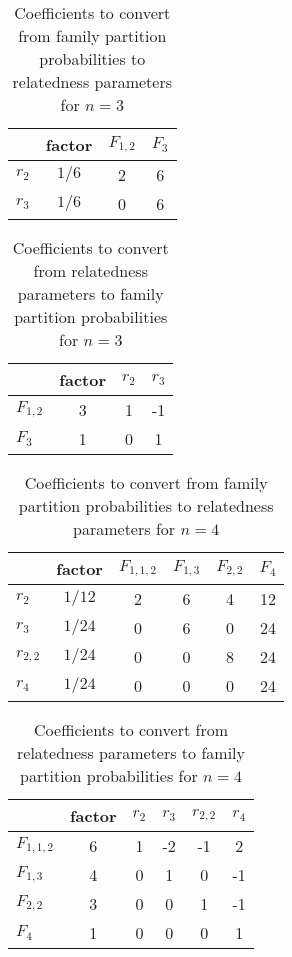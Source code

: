\begin{table}[h]
\centering
\caption{Coefficients to convert from family partition probabilities to relatedness parameters for $n=3$}
\begin{tabular}{lccc}
\toprule
        & factor &  $F_{1,2}$ &  $F_{3}$ \\
\midrule
$r_{2}$ &  $1/6$ &          2 &        6 \\
$r_{3}$ &  $1/6$ &          0 &        6 \\
\bottomrule
\end{tabular}
\end{table}

\begin{table}[h]
\centering
\caption{Coefficients to convert from relatedness parameters to family partition probabilities for $n=3$}
\begin{tabular}{lccc}
\toprule
          &  factor &  $r_{2}$ &  $r_{3}$ \\
\midrule
$F_{1,2}$ &       3 &        1 &       -1 \\
  $F_{3}$ &       1 &        0 &        1 \\
\bottomrule
\end{tabular}
\end{table}

\begin{table}[h]
\centering
\caption{Coefficients to convert from family partition probabilities to relatedness parameters for $n=4$}
\begin{tabular}{lccccc}
\toprule
          & factor &  $F_{1,1,2}$ &  $F_{1,3}$ &  $F_{2,2}$ &  $F_{4}$ \\
\midrule
  $r_{2}$ & $1/12$ &            2 &          6 &          4 &       12 \\
  $r_{3}$ & $1/24$ &            0 &          6 &          0 &       24 \\
$r_{2,2}$ & $1/24$ &            0 &          0 &          8 &       24 \\
  $r_{4}$ & $1/24$ &            0 &          0 &          0 &       24 \\
\bottomrule
\end{tabular}
\end{table}

\begin{table}[h]
\centering
\caption{Coefficients to convert from relatedness parameters to family partition probabilities for $n=4$}
\begin{tabular}{lccccc}
\toprule
            &  factor &  $r_{2}$ &  $r_{3}$ &  $r_{2,2}$ &  $r_{4}$ \\
\midrule
$F_{1,1,2}$ &       6 &        1 &       -2 &         -1 &        2 \\
  $F_{1,3}$ &       4 &        0 &        1 &          0 &       -1 \\
  $F_{2,2}$ &       3 &        0 &        0 &          1 &       -1 \\
    $F_{4}$ &       1 &        0 &        0 &          0 &        1 \\
\bottomrule
\end{tabular}
\end{table}

